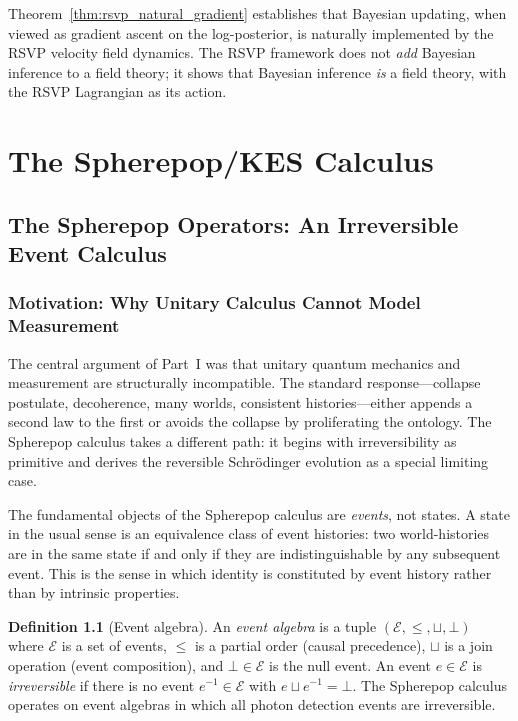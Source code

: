 \documentclass[11pt, openright, twoside]{book}
\theoremstyle{plain}
\theoremstyle{definition}
\newtheorem{definition}[theorem]{Definition}
\theoremstyle{remark}
\begin{document}
Theorem~\ref{thm:rsvp_natural_gradient} establishes that Bayesian updating, when viewed
as gradient ascent on the log-posterior, is naturally implemented by the RSVP velocity
field dynamics. The RSVP framework does not \emph{add} Bayesian inference to a field theory;
it shows that Bayesian inference \emph{is} a field theory, with the RSVP Lagrangian as
its action.


\part{The Spherepop/KES Calculus}

\chapter{The Spherepop Operators: An Irreversible Event Calculus}

\section{Motivation: Why Unitary Calculus Cannot Model Measurement}

The central argument of Part~I was that unitary quantum mechanics and measurement are
structurally incompatible. The standard response---collapse postulate, decoherence, many
worlds, consistent histories---either appends a second law to the first or avoids the
collapse by proliferating the ontology. The Spherepop calculus takes a different path:
it begins with irreversibility as primitive and derives the reversible Schr\"{o}dinger
evolution as a special limiting case.

The fundamental objects of the Spherepop calculus are \emph{events}, not states. A state
in the usual sense is an equivalence class of event histories: two world-histories are in
the same state if and only if they are indistinguishable by any subsequent event. This is
the sense in which identity is constituted by event history rather than by intrinsic
properties.

\begin{definition}[Event algebra]
\label{def:event_algebra}
An \emph{event algebra} is a tuple $(\mathcal{E}, \leq, \sqcup, \bot)$ where $\mathcal{E}$
is a set of events, $\leq$ is a partial order (causal precedence), $\sqcup$ is a join
operation (event composition), and $\bot \in \mathcal{E}$ is the null event. An event
$e \in \mathcal{E}$ is \emph{irreversible} if there is no event $e^{-1} \in \mathcal{E}$
with $e \sqcup e^{-1} = \bot$. The Spherepop calculus operates on event algebras in which
all photon detection events are irreversible.
\end{definition}
\end{document}
